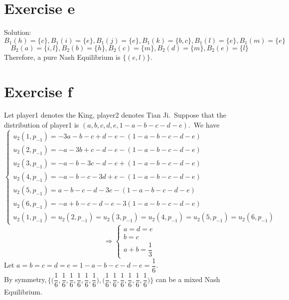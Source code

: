 \documentclass[a4papers]{ctexart}
\begin{document}
\section*{Exercise e}
\noindent Solution:
\[ B_1(h)=\{ c\},B_1(i)=\{ e\},B_1(j)=\{ e\},B_1(k)=\{ b,c\},B_1(l)=\{ e\},B_1(m)=\{ e\}\]
\[ B_2(a)=\{ i,l\},B_2(b)=\{ h \},B_2(c)=\{ m\},B_2(d)=\{ m\},B_2(e)=\{ l\}\]
Therefore, a pure Nash Equilibrium is $\{ (e,l)\}.$

\section*{Exercise f}
Let player1 denotes the King, player2 denotes Tian Ji.\,
Suppose that the distribution of player1 is $(a,b,c,d,e,1-a-b-c-d-e)$.\,
We have 
\begin{equation*}
    \begin{cases}
        u_2(1,p_{-1})=-3a-b-c+d-e-(1-a-b-c-d-e)\\
        u_2(2,p_{-1})=-a-3b+c-d-e-(1-a-b-c-d-e)\\
        u_2(3,p_{-1})=-a-b-3c-d-e+(1-a-b-c-d-e)\\
        u_2(4,p_{-1})=-a-b-c-3d+e-(1-a-b-c-d-e)\\
        u_2(5,p_{-1})=a-b-c-d-3e-(1-a-b-c-d-e)\\
        u_2(6,p_{-1})=-a+b-c-d-e-3(1-a-b-c-d-e)\\
        u_2(1,p_{-1})=u_2(2,p_{-1})=u_2(3,p_{-1})=u_2(4,p_{-1})=u_2(5,p_{-1})=u_2(6,p_{-1})
    \end{cases}
\end{equation*}
\begin{equation*}
    \Rightarrow
    \begin{cases}
        a=d=e\\b=c\\a+b=\dfrac{1}{3}
    \end{cases}
\end{equation*}
Let $a=b=c=d=e=1-a-b-c-d-e=\dfrac{1}{6}$.\\
By symmetry,\,$\Big\{\big(\dfrac{1}{6},\dfrac{1}{6},\dfrac{1}{6},\dfrac{1}{6},\dfrac{1}{6},\dfrac{1}{6}\big),\big(\dfrac{1}{6},\dfrac{1}{6},\dfrac{1}{6},\dfrac{1}{6},\dfrac{1}{6},\dfrac{1}{6}\big)\Big\}$
can be a mixed Nash Equilibrium.
\end{document}
